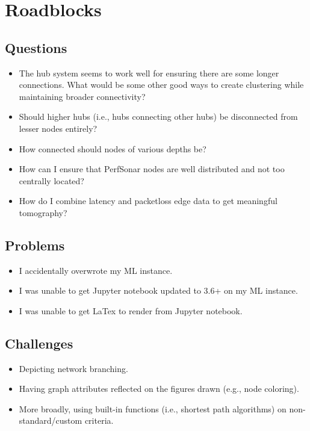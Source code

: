 \documentclass{weeklyreport}
\begin{document}
\pagebreak
\section*{Roadblocks}

\subsection*{Questions}

\begin{itemize}
	\item The hub system seems to work well for ensuring there are some longer connections. What would be some other good ways to create clustering while maintaining broader connectivity?
	\item Should higher hubs (i.e., hubs connecting other hubs) be disconnected from lesser nodes entirely?
	\item How connected should nodes of various depths be?
	\item How can I ensure that PerfSonar nodes are well distributed and not too centrally located?
	\item How do I combine latency and packetloss edge data to get meaningful tomography?
\end{itemize}

\subsection*{Problems}

\begin{itemize}
	\item I accidentally overwrote my ML instance.
	\item I was unable to get Jupyter notebook updated to 3.6+ on my ML instance.
	\item I was unable to get LaTex to render from Jupyter notebook.
\end{itemize}

\subsection*{Challenges}

\begin{itemize}
    \item Depicting network branching.
    \item Having graph attributes reflected on the figures drawn (e.g., node coloring).
    \item More broadly, using built-in functions (i.e., shortest path algorithms) on non-standard/custom criteria.
\end{itemize}
\end{document}

